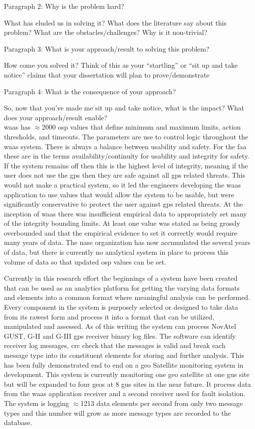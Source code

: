 Paragraph 2: Why is the problem hard?

What has eluded us in solving it? What does the literature say about this problem? What are the obstacles/challenges? Why is it non-trivial?

Paragraph 3: What is your approach/result to solving this problem?

How come you solved it? Think of this as your “startling” or “sit up and take notice” claims that your dissertation will plan to prove/demonstrate

Paragraph 4: What is the consequence of your approach?

So, now that you’ve made me sit up and take notice, what is the impact? What does your approach/result enable?
~\\

\ac{waas} has $\approx$2000 \ac{osp} values that define minimum and maximum limits, action thresholds, and timeouts. The parameters are use to control logic throughout the \ac{waas} system. There is always a balance between usability and safety.  For the \ac{faa} these are in the terms availability/continuity for usability and integrity for safety.  If the system remains off then this is the highest level of integrity, meaning if the user does not use the \ac{gps} then they are safe against all \ac{gps} related threats.  This would not make a practical system, so it led the engineers developing the \ac{waas} application to use values that would allow the system to be usable, but were significantly conservative to protect the user against \ac{gps} related threats.  At the inception of \ac{waas} there was insufficient empirical data to appropriately set many of the integrity bounding limits.  At least one value was stated as being grossly overbounded and that the empirical evidence to set it correctly would require many years of data.  The \ac{nase} organization has now accumulated the several years of data, but there is currently no analytical system in place to process this volume of data so that updated \ac{osp} values can be set.

Currently in this research effort the beginnings of a system have been created that can be used as an analytics platform for getting the varying data formats and elements into a common format where meaningful analysis can be performed.  Every component in the system is purposely selected or designed to take data from its rawest form and process it into a format that can be utilized, manipulated and assessed. As of this writing the system can process NovAtel GUST, G-II and G-III \ac{gps} receiver binary log files. The software can identify receiver log messages, \ac{crc} check that the messages is valid and break each message type into its constituent elements for storing and further analysis. This has been fully demonstrated end to end on a \ac{geo} Satellite monitoring system in development. This system is currently monitoring one \ac{geo} satellite at one \ac{gus} site but will be expanded to four \ac{geo}s at 8 \ac{gus} sites in the near future. It process data from the \ac{waas} application receiver and a second receiver used for fault isolation. The system is logging $\approx$1213 data elements per second from only two message types and this number will grow as more message types are recorded to the database.
